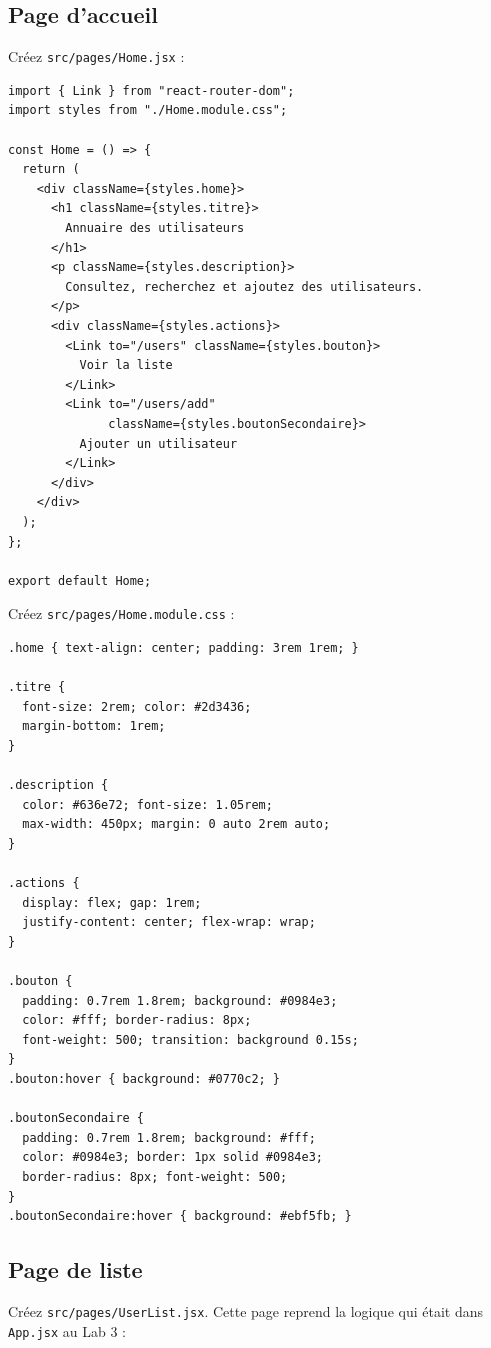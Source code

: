\documentclass[11pt,a4paper]{article}
\begin{document}
\subsection{Page d'accueil}

Créez \texttt{src/pages/Home.jsx} :

\begin{lstlisting}
import { Link } from "react-router-dom";
import styles from "./Home.module.css";

const Home = () => {
  return (
    <div className={styles.home}>
      <h1 className={styles.titre}>
        Annuaire des utilisateurs
      </h1>
      <p className={styles.description}>
        Consultez, recherchez et ajoutez des utilisateurs.
      </p>
      <div className={styles.actions}>
        <Link to="/users" className={styles.bouton}>
          Voir la liste
        </Link>
        <Link to="/users/add"
              className={styles.boutonSecondaire}>
          Ajouter un utilisateur
        </Link>
      </div>
    </div>
  );
};

export default Home;
\end{lstlisting}

Créez \texttt{src/pages/Home.module.css} :

\begin{lstlisting}[style=css]
.home { text-align: center; padding: 3rem 1rem; }

.titre {
  font-size: 2rem; color: #2d3436;
  margin-bottom: 1rem;
}

.description {
  color: #636e72; font-size: 1.05rem;
  max-width: 450px; margin: 0 auto 2rem auto;
}

.actions {
  display: flex; gap: 1rem;
  justify-content: center; flex-wrap: wrap;
}

.bouton {
  padding: 0.7rem 1.8rem; background: #0984e3;
  color: #fff; border-radius: 8px;
  font-weight: 500; transition: background 0.15s;
}
.bouton:hover { background: #0770c2; }

.boutonSecondaire {
  padding: 0.7rem 1.8rem; background: #fff;
  color: #0984e3; border: 1px solid #0984e3;
  border-radius: 8px; font-weight: 500;
}
.boutonSecondaire:hover { background: #ebf5fb; }
\end{lstlisting}

\subsection{Page de liste}

Créez \texttt{src/pages/UserList.jsx}. Cette page reprend la logique qui était dans \texttt{App.jsx} au Lab 3 :
\end{document}
